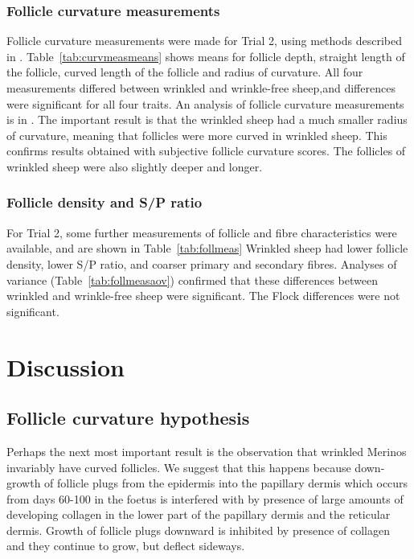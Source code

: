 \documentclass{article}
\begin{document}
\subsubsection{Follicle curvature measurements}
Follicle curvature measurements were made for Trial 2, using methods described in \cite{watts-2018}.  Table~\ref{tab:curvmeasmeans} shows means for follicle depth, straight length of the follicle, curved length of the follicle and radius of curvature. 
%
All four measurements differed between wrinkled and wrinkle-free sheep,and differences were significant for all four traits.  An analysis of follicle curvature measurements is in \cite{watts-2018}. 
The important result is that the wrinkled sheep had a much smaller radius of curvature, meaning that follicles were more curved in wrinkled sheep. This confirms results obtained with subjective follicle curvature scores.  The follicles of wrinkled sheep were also slightly deeper and longer. 

\subsubsection{Follicle density and S/P ratio}
For Trial 2, some further measurements of follicle and fibre characteristics were available, and are shown in Table~\ref{tab:follmeas}
%
Wrinkled sheep had lower follicle density, lower S/P ratio, and coarser primary and secondary fibres.  Analyses of variance (Table~\ref{tab:follmeasaov}) confirmed that these differences between wrinkled and wrinkle-free sheep were significant. The Flock differences were not significant.
%


\section{Discussion}
 
\subsection{Follicle curvature hypothesis}
Perhaps the next most important result is the observation that wrinkled Merinos invariably have curved follicles. We suggest that this happens because down-growth of follicle plugs from the epidermis into the papillary dermis which occurs from days 60-100 in the foetus is interfered with by presence of large amounts of developing collagen in the lower part of the papillary dermis and the reticular dermis. Growth of follicle plugs downward is inhibited by presence of collagen and they continue to grow, but deflect sideways.
\end{document}
